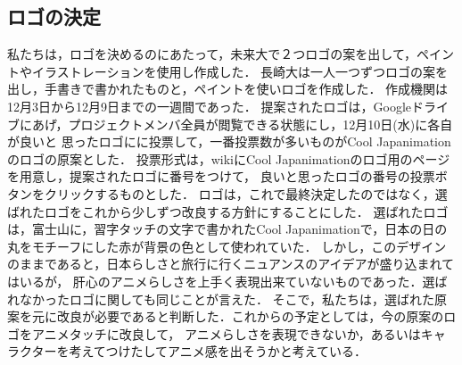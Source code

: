 \subsection{ロゴの決定}
\par
私たちは，ロゴを決めるのにあたって，未来大で２つロゴの案を出して，ペイントやイラストレーションを使用し作成した．
長崎大は一人一つずつロゴの案を出し，手書きで書かれたものと，ペイントを使いロゴを作成した．
作成機関は12月3日から12月9日までの一週間であった．
提案されたロゴは，Googleドライブにあげ，プロジェクトメンバ全員が閲覧できる状態にし，12月10日(水)に各自が良いと
思ったロゴにに投票して，一番投票数が多いものがCool Japanimationのロゴの原案とした．
投票形式は，wikiにCool Japanimationのロゴ用のページを用意し，提案されたロゴに番号をつけて，
良いと思ったロゴの番号の投票ボタンをクリックするものとした．
ロゴは，これで最終決定したのではなく，選ばれたロゴをこれから少しずつ改良する方針にすることにした．
選ばれたロゴは，富士山に，習字タッチの文字で書かれたCool Japanimationで，日本の日の丸をモチーフにした赤が背景の色として使われていた．
しかし，このデザインのままであると，日本らしさと旅行に行くニュアンスのアイデアが盛り込まれてはいるが，
肝心のアニメらしさを上手く表現出来ていないものであった．選ばれなかったロゴに関しても同じことが言えた．
そこで，私たちは，選ばれた原案を元に改良が必要であると判断した．これからの予定としては，今の原案のロゴをアニメタッチに改良して，
アニメらしさを表現できないか，あるいはキャラクターを考えてつけたしてアニメ感を出そうかと考えている．
